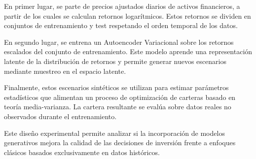 En primer lugar, se parte de precios ajustados diarios de activos financieros, a partir de los cuales se calculan retornos logarítmicos. Estos retornos se dividen en conjuntos de entrenamiento y test respetando el orden temporal de los datos.

En segundo lugar, se entrena un Autoencoder Variacional sobre los retornos escalados del conjunto de entrenamiento. Este modelo aprende una representación latente de la distribución de retornos y permite generar nuevos escenarios mediante muestreo en el espacio latente.

Finalmente, estos escenarios sintéticos se utilizan para estimar parámetros estadísticos que alimentan un proceso de optimización de carteras basado en teoría media-varianza. La cartera resultante se evalúa sobre datos reales no observados durante el entrenamiento.

Este diseño experimental permite analizar si la incorporación de modelos generativos mejora la calidad de las decisiones de inversión frente a enfoques clásicos basados exclusivamente en datos históricos.
